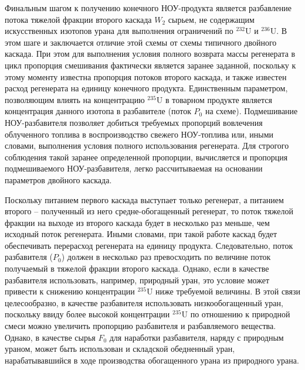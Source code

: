 Финальным шагом к получению конечного НОУ-продукта является разбавление потока тяжелой фракции второго каскада $W_2$ сырьем, не содержащим искусственных изотопов урана для выполнения ограничений по $^{232}$U и $^{236}$U. В этом шаге и заключается отличие этой схемы от схемы типичного двойного каскада. При этом для выполнения условия полного возврата массы регенерата в цикл пропорция смешивания фактически является заранее заданной, поскольку к этому моменту известна пропорция потоков второго каскада, и также известен расход регенерата на единицу конечного продукта. Единственным параметром, позволяющим влиять на концентрацию $^{235}$U в товарном продукте является концентрация данного изотопа в разбавителе (поток $P_0$ на схеме).
Подмешивание НОУ-разбавителя позволяет добиться требуемых пропорций вовлечения облученного топлива в воспроизводство свежего НОУ-топлива или, иными словами, выполнения условия полного использования регенерата. Для строгого соблюдения такой заранее определенной пропорции, вычисляется и пропорция подмешиваемого НОУ-разбавителя, легко рассчитываемая на основании параметров двойного каскада.

Поскольку питанием первого каскада выступает только регенерат, а питанием второго -- полученный из него средне-обогащенный регенерат, то поток тяжелой фракции на выходе из второго каскада будет в несколько раз меньше, чем исходный поток регенерата. Иными словами, при такой работе каскад будет обеспечивать перерасход регенерата на единицу продукта. Следовательно, поток разбавителя ($P_{0}$) должен в несколько раз превосходить по величине поток получаемый в тяжелой фракции второго каскада. Однако, если в качестве разбавителя использовать, например, природный уран, это условие может привести к снижению концентрации $^{235}$U ниже требуемой величины. В этой связи целесообразно, в качестве разбавителя использовать низкообогащенный уран, поскольку ввиду более высокой концентрации $^{235}$U по отношению к природной смеси можно увеличить пропорцию разбавителя и разбавляемого вещества. Однако, в качестве сырья $F_0$ для наработки разбавителя, наряду с природным ураном, может быть использован и складской обедненный уран, нарабатывавшийся в ходе производства обогащенного урана из природного урана. 

